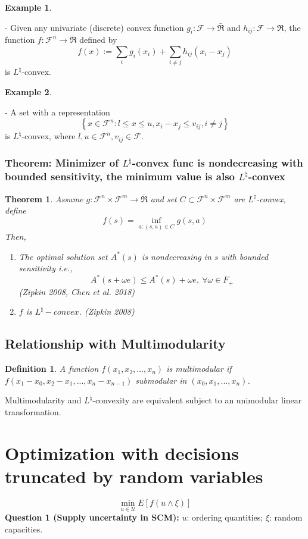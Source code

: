 \documentclass[11pt,a4paper]{article}
\newtheorem{theorem}{Theorem}
\newtheorem{definition}{Definition}
\newtheorem{example}{Example}
\begin{document}
\begin{example}
\end{example}
    - Given any univariate (discrete) convex function $g_{i}: \mathcal{F} \rightarrow \bar{\Re}$ and $h_{i j}: \mathcal{F} \rightarrow \Re$, the function $f: \mathcal{F}^{n} \rightarrow \bar{\Re}$ defined by
    $$
    f(x):=\sum_{i} g_{i}\left(x_{i}\right)+\sum_{i \neq j} h_{i j}\left(x_{i}-x_{j}\right)
    $$
    is $L^{\natural}$-convex.

\begin{example}
\end{example}
    - A set with a representation
    $$
    \left\{x \in \mathcal{F}^{n}: l \leq x \leq u, x_{i}-x_{j} \leq v_{i j}, i \neq j\right\}
    $$
    is $L^{\natural}$-convex, where $l, u \in \mathcal{F}^{n}, v_{i j} \in \mathcal{F}$.

\subsubsection{Theorem: Minimizer of $L^\natural$-convex func is nondecreasing with bounded sensitivity, the minimum value is also $L^\natural$-convex}
\begin{theorem}
Assume $g:\mathcal{F}^n\times \mathcal{F}^m \rightarrow	\overline{\Re}$ and set $C\subset \mathcal{F}^n\times \mathcal{F}^m$ are $L^\natural$-convex, define $$f(s)=\inf_{a:(s,a)\in C}g(s,a)$$
Then,
\begin{enumerate}
    \item The optimal solution set $A^*(s)$ is nondecreasing in $s$ with bounded sensitivity i.e., $$A^*(s+\omega e)\leq A^*(s)+\omega e,\ \forall \omega\in F_+$$ (Zipkin 2008, Chen et al. 2018)
    \item $f$ is $L^\natural-convex$. (Zipkin 2008)
\end{enumerate}
\end{theorem}

\subsection{Relationship with Multimodularity}
\begin{definition}
A function $f(x_1,x_2,...,x_n)$ is multimodular if $f(x_1-x_0,x_2-x_1,...,x_n-x_{n-1})$ submodular in $(x_0,x_1,...,x_n)$.
\end{definition}
Multimodularity and $L^\natural$-convexity are equivalent subject to an unimodular linear transformation.

\section{Optimization with decisions truncated by random variables}
$$\min_{u\in \mathcal{U}} E[f(u\wedge \xi)]$$
\textbf{Question 1 (Supply uncertainty in SCM):} $u$: ordering quantities; $\xi$: random capacities.
\end{document}
